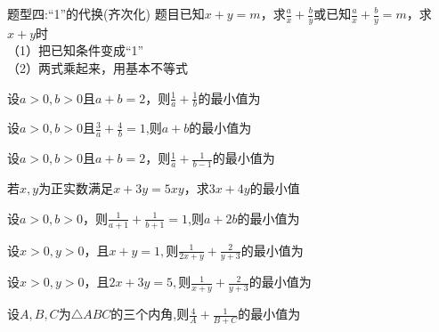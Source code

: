 \begin{tcolorbox} 
    \centering
    题型四:“1”的代换(齐次化)
    \tcblower %
    题目已知$x+y=m$，求$\displaystyle \frac{a}{x}+\frac{b}{y}$\quad 或\quad 已知$\displaystyle \frac{a}{x}+\frac{b}{y}=m$，求$x+y$时\\
    （1）把已知条件变成“1” \\
    （2）两式乘起来，用基本不等式
\end{tcolorbox}

\par
\begin{problem}
    设$a>0,b>0$且$a+b=2$，则$\displaystyle \frac{1}{a}+\frac{1}{b}$的最小值为
\end{problem}

\par
\begin{problem}
    设$a>0,b>0$且$\displaystyle \frac{3}{a}+\frac{4}{b}=1$,则$a+b$的最小值为
\end{problem}

\par
\begin{problem}
    设$a>0,b>0$且$a+b=2$，则$\displaystyle \frac{1}{a}+\frac{1}{b-1}$的最小值为
\end{problem}

\par
\begin{problem}
    若$x,y$为正实数满足$x+3y=5xy$，求$3x+4y$的最小值
\end{problem}

\par
\begin{problem}
    设$a>0,b>0$，则$\displaystyle \frac{1}{a+1}+\frac{1}{b+1}=1$,则$a+2b$的最小值为
\end{problem}

\par
\begin{problem}
    设$x>0,y>0$，且$x+y=1,$则$\displaystyle \frac{1}{2x+y}+\frac{2}{y+3}$的最小值为
\end{problem}

\par
\begin{problem}
    设$x>0,y>0$，且$2x+3y=5,$则$\displaystyle \frac{1}{x+y}+\frac{2}{y+3}$的最小值为
\end{problem}

\par
\begin{problem}
    设$A,B,C$为$\bigtriangleup ABC$的三个内角,则$\displaystyle \frac{4}{A}+\frac{1}{B+C}$的最小值为
\end{problem}


